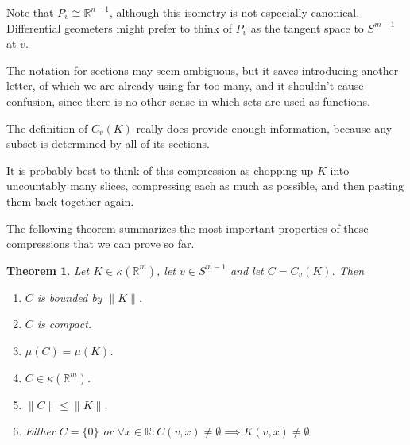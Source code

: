 \documentclass[a4paper,11pt]{article}
\newcommand{\bbR}{\mathbb{R}}
\newcommand{\lV}{\lVert}
\newcommand{\rV}{\rVert}
\newcommand{\isom}{\cong}
\newtheorem{thm}{Theorem}[section]
\begin{document}
Note that $P_v\isom\bbR^{n-1}$,
although this isometry is not especially canonical.  Differential geometers
might prefer to think of $P_v$ as the tangent space to $S^{m-1}$ at $v$.

The notation for sections may seem ambiguous, but it saves introducing another
letter, of which we are already using far too many, and it shouldn't cause
confusion, since there is no other sense in which sets are used as functions.

The definition of $C_v(K)$ really does provide enough information, because any
subset is determined by all of its sections.

It is probably best to think of this compression as chopping up $K$ into
uncountably many slices, compressing each as much as possible, and then pasting
them back together again.

The following theorem summarizes the most important properties of these
compressions that we can prove so far.

\begin{thm}
\label{thm:compressionProperties}
Let $K\in\kappa(\bbR^m)$, let $v\in S^{m-1}$ and let $C=C_v(K)$.  Then
\begin{enumerate}
\item $C$ is bounded by $\lV K\rV$.
\label{prop:compressionBounded}
\item $C$ is compact.
\label{prop:compressionCompact}
\item $\mu(C)=\mu(K)$.
\label{prop:compressionMeasurePreserving}
\item $C\in\kappa(\bbR^m)$.
\label{prop:compressionNonEmpty}
\item $\lV C\rV\leq\lV K\rV$.
\label{prop:compressionNormDecreasing}
\item Either $C=\{0\}$ or
	$\forall x\in\bbR:C(v,x)\not=\emptyset\implies K(v,x)\not=\emptyset$
\label{prop:compressionNonCreative}
\end{enumerate}
\end{thm}
\end{document}
